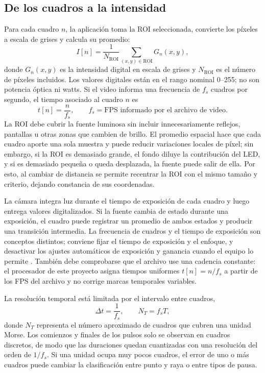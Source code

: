 \documentclass[11pt,a4paper]{article}
\begin{document}
\subsection{De los cuadros a la intensidad}
Para cada cuadro \(n\), la aplicación toma la ROI seleccionada, convierte los píxeles a escala de grises y calcula su promedio:
\begin{equation}
I[n]=\frac{1}{N_{\mathrm{ROI}}}\sum_{(x,y)\in\mathrm{ROI}}G_n(x,y),
\label{eq:intensidad}
\end{equation}
donde \(G_n(x,y)\) es la intensidad digital en escala de grises y \(N_{\mathrm{ROI}}\) es el número de píxeles incluidos. Los valores digitales están en el rango nominal 0--255; no son potencia óptica ni watts. Si el video informa una frecuencia de \(f_s\) cuadros por segundo, el tiempo asociado al cuadro \(n\) es
\begin{equation}
t[n]=\frac{n}{f_s},\qquad f_s=\text{FPS informado por el archivo de video}.
\end{equation}
La ROI debe cubrir la fuente luminosa sin incluir innecesariamente reflejos, pantallas u otras zonas que cambien de brillo. El promedio espacial hace que cada cuadro aporte una sola muestra y puede reducir variaciones locales de píxel; sin embargo, si la ROI es demasiado grande, el fondo diluye la contribución del LED, y si es demasiado pequeña o queda desplazada, la fuente puede salir de ella. Por esto, al cambiar de distancia se permite recentrar la ROI con el mismo tamaño y criterio, dejando constancia de sus coordenadas.

La cámara integra luz durante el tiempo de exposición de cada cuadro y luego entrega valores digitalizados. Si la fuente cambia de estado durante una exposición, el cuadro puede registrar un promedio de ambos estados y producir una transición intermedia. La frecuencia de cuadros y el tiempo de exposición son conceptos distintos; conviene fijar el tiempo de exposición y el enfoque, y desactivar los ajustes automáticos de exposición y ganancia cuando el equipo lo permite \cite{Bachhuber}. También debe comprobarse que el archivo use una cadencia constante: el procesador de este proyecto asigna tiempos uniformes \(t[n]=n/f_s\) a partir de los FPS del archivo y no corrige marcas temporales variables.

La resolución temporal está limitada por el intervalo entre cuadros,
\begin{equation}
\Delta t=\frac{1}{f_s}, \qquad N_T=f_sT,
\label{eq:muestras-unidad}
\end{equation}
donde \(N_T\) representa el número aproximado de cuadros que cubren una unidad Morse. Los comienzos y finales de los pulsos solo se observan en cuadros discretos, de modo que las duraciones quedan cuantizadas con una resolución del orden de \(1/f_s\). Si una unidad ocupa muy pocos cuadros, el error de uno o más cuadros puede cambiar la clasificación entre punto y raya o entre tipos de pausa.
\end{document}
